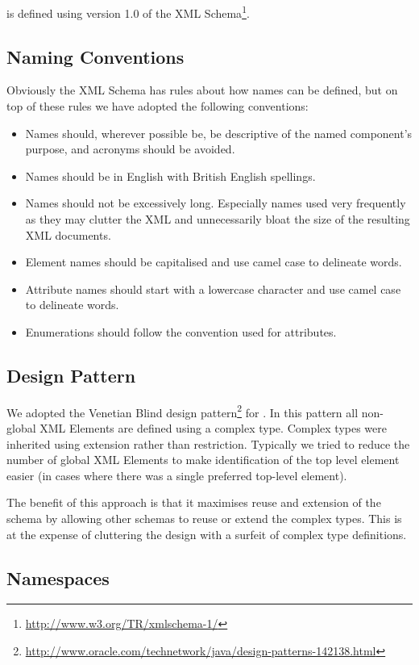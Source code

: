 \pharmml is defined using version 1.0 of the XML Schema\footnote{\url{http://www.w3.org/TR/xmlschema-1/}}.

\subsection{Naming Conventions}

Obviously the XML Schema has rules about how names can be defined, but on
top of these rules we have adopted the following conventions:

\begin{itemize}
\item Names should, wherever possible be, be descriptive of the named
  component's purpose, and acronyms should be avoided.
\item Names should be in English with British English spellings.
\item Names should not be excessively long. Especially names used very
  frequently as they may clutter the XML and unnecessarily bloat the
  size of the resulting XML documents.
\item Element names should be capitalised and use camel case to
  delineate words.
\item Attribute names should start with a lowercase character and use
  camel case to delineate words.
\item Enumerations should follow the convention used for attributes.
\end{itemize}

\subsection{Design Pattern}

We adopted the Venetian Blind design
pattern\footnote{\url{http://www.oracle.com/technetwork/java/design-patterns-142138.html}}
for \pharmml. In this pattern all non-global XML Elements are
defined using a complex type. Complex types were inherited using
extension rather than restriction. Typically we tried to reduce the
number of global XML Elements to make identification of the top level
element easier (in cases where there was a single preferred top-level
element).

The benefit of this approach is that it maximises reuse and extension
of the schema by allowing other schemas to reuse or extend the complex
types. This is at the expense of cluttering the design with a surfeit
of complex type definitions.

\subsection{Namespaces}

